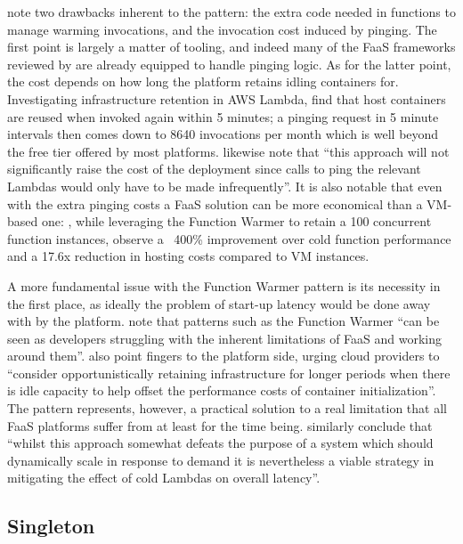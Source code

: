 \textcite{leitner18industrialpractice} note two drawbacks inherent to the pattern: the extra code needed in functions to manage warming invocations, and the invocation cost induced by pinging. The first point is largely a matter of tooling, and indeed many of the FaaS frameworks reviewed by \textcite{kritikos18frameworks} are already equipped to handle pinging logic. As for the latter point, the cost depends on how long the platform retains idling containers for. Investigating infrastructure retention in AWS Lambda, \textcite{lloydserverless} find that host containers are reused when invoked again within 5 minutes; a pinging request in 5 minute intervals then comes down to 8640 invocations per month which is well beyond the free tier offered by most platforms. \textcite{bardsley18optimizationStrategies} likewise note that ``this approach will not significantly raise the cost of the deployment since calls to ping the relevant Lambdas would only have to be made infrequently''. It is also notable that even with the extra pinging costs a FaaS solution can be more economical than a VM-based one: \textcite{lloyd18migration}, while leveraging the Function Warmer to retain a 100 concurrent function instances, observe a ~400\% improvement over cold function performance and a 17.6x reduction in hosting costs compared to VM instances.

A more fundamental issue with the Function Warmer pattern is its necessity in the first place, as ideally the problem of start-up latency would be done away with by the platform. \textcite{leitner18industrialpractice} note that patterns such as the Function Warmer ``can be seen as developers struggling with the inherent limitations of FaaS and working around them''. \textcite{lloydserverless} also point fingers to the platform side, urging cloud providers to ``consider opportunistically retaining infrastructure for longer periods when there is idle capacity to help offset the performance costs of container initialization''. The pattern represents, however, a practical solution to a real limitation that all FaaS platforms suffer from at least for the time being. \textcite{bardsley18optimizationStrategies} similarly conclude that ``whilst this approach somewhat defeats the purpose of a system which should dynamically scale in response to demand it is nevertheless a viable strategy in mitigating the effect of cold Lambdas on overall latency''.

\subsection{Singleton} \label{subsec:Singleton}

